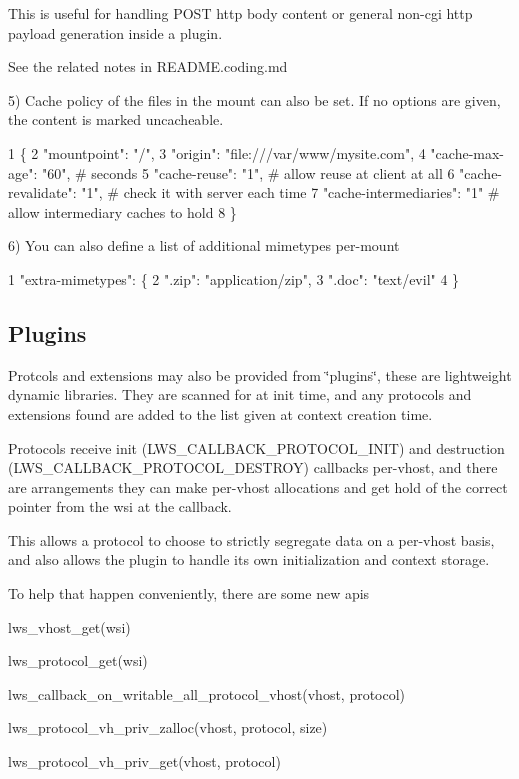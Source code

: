 This is useful for handling P\+O\+ST http body content or general non-\/cgi http payload generation inside a plugin.

See the related notes in R\+E\+A\+D\+M\+E.\+coding.\+md

5) Cache policy of the files in the mount can also be set. If no options are given, the content is marked uncacheable. 
\begin{DoxyCode}
1 \{
2  "mountpoint": "/",
3  "origin": "file:///var/www/mysite.com",
4  "cache-max-age": "60",      # seconds
5  "cache-reuse": "1",         # allow reuse at client at all
6  "cache-revalidate": "1",    # check it with server each time
7  "cache-intermediaries": "1" # allow intermediary caches to hold
8 \}
\end{DoxyCode}


6) You can also define a list of additional mimetypes per-\/mount 
\begin{DoxyCode}
1 "extra-mimetypes": \{
2          ".zip": "application/zip",
3          ".doc": "text/evil"
4  \}
\end{DoxyCode}


\subsection*{Plugins }

Protcols and extensions may also be provided from \char`\"{}plugins\char`\"{}, these are lightweight dynamic libraries. They are scanned for at init time, and any protocols and extensions found are added to the list given at context creation time.

Protocols receive init (L\+W\+S\+\_\+\+C\+A\+L\+L\+B\+A\+C\+K\+\_\+\+P\+R\+O\+T\+O\+C\+O\+L\+\_\+\+I\+N\+IT) and destruction (L\+W\+S\+\_\+\+C\+A\+L\+L\+B\+A\+C\+K\+\_\+\+P\+R\+O\+T\+O\+C\+O\+L\+\_\+\+D\+E\+S\+T\+R\+OY) callbacks per-\/vhost, and there are arrangements they can make per-\/vhost allocations and get hold of the correct pointer from the wsi at the callback.

This allows a protocol to choose to strictly segregate data on a per-\/vhost basis, and also allows the plugin to handle its own initialization and context storage.

To help that happen conveniently, there are some new apis


\begin{DoxyItemize}
\item lws\+\_\+vhost\+\_\+get(wsi)
\item lws\+\_\+protocol\+\_\+get(wsi)
\item lws\+\_\+callback\+\_\+on\+\_\+writable\+\_\+all\+\_\+protocol\+\_\+vhost(vhost, protocol)
\item lws\+\_\+protocol\+\_\+vh\+\_\+priv\+\_\+zalloc(vhost, protocol, size)
\item lws\+\_\+protocol\+\_\+vh\+\_\+priv\+\_\+get(vhost, protocol)
\end{DoxyItemize}

